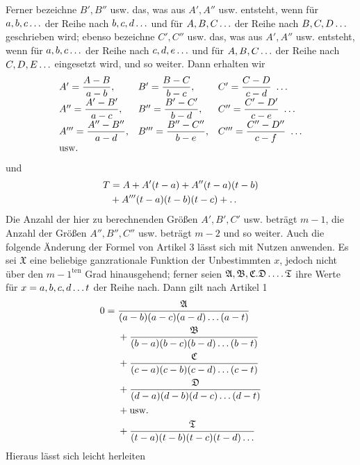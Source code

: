 Ferner bezeichne $B',B''$ usw. das, was aus $A',A''$ usw. entsteht, wenn für $a,b,c\mathinner{.\,.\,.}$
der Reihe nach $b,c,d\mathinner{.\,.\,.}$ und für $A,B,C\mathinner{.\,.\,.}$ der Reihe nach $B,C,D\mathinner{.\,.\,.}$ geschrieben wird; ebenso bezeichne $C',C''$ usw. das, was aus $A',A''$ usw. entsteht, wenn für $a,b,c\mathinner{.\,.\,.}$ der Reihe nach $c,d,e\mathinner{.\,.\,.}$ und für $A,B,C\mathinner{.\,.\,.}$ der Reihe nach $C,D,E\mathinner{.\,.\,.}$ eingesetzt wird, und so weiter. Dann erhalten wir
\[
\begin{array}{lll}
A'=\dfrac{A-B}{a-b},&B'=\dfrac{B-C}{b-c},&C'=\dfrac{C-D}{c-d}\ \mathinner{.\,.\,.}\\[5pt]
A''=\dfrac{A'-B'}{a-c},&B''=\dfrac{B'-C'}{b-d},&C''=\dfrac{C'-D'}{c-e}\ \mathinner{.\,.\,.}\\[5pt]
A'''=\dfrac{A''-B''}{a-d},&B'''=\dfrac{B''-C''}{b-e},&C'''=\dfrac{C''-D''}{c-f}\ \mathinner{.\,.\,.}\\
\text{usw.}&&
\end{array}
\]
und
\[\begin{aligned}
T&=A+A'(t-a)+A''(t-a)(t-b)\\&+A'''(t-a)(t-b)(t-c)+\mathinner{.\,.}
\end{aligned}\]
Die Anzahl der hier zu berechnenden Größen $A',B',C'$ usw. beträgt $m-1$, die Anzahl der
Größen $A'',B'',C''$ usw. beträgt $m-2$ und so weiter.
Auch die folgende Änderung der Formel von Artikel 3 lässt sich
mit Nutzen anwenden. Es sei $\mathfrak{X}$ eine beliebige ganzrationale Funktion der Unbestimmten $x$, jedoch nicht über den
$m-1^{\mathrm{ten}}$ Grad hinausgehend; ferner seien $\mathfrak{A},\mathfrak{B},\mathfrak{C}.\mathfrak{D}\mathinner{.\,.\,.\,.}\mathfrak{T}$ ihre Werte für $x=a,b,c,d\mathinner{.\,.\,.}t$
der Reihe nach. Dann gilt nach Artikel 1
\[
\begin{aligned}
0={}&\frac{\mathfrak{A}}{(a-b)(a-c)(a-d)\mathinner{.\,.\,.}(a-t)}\\
&{}+\frac{\mathfrak{B}}{(b-a)(b-c)(b-d)\mathinner{.\,.\,.}(b-t)}\\
&{}+\frac{\mathfrak{C}}{(c-a)(c-b)(c-d)\mathinner{.\,.\,.}(c-t)}\\
&{}+\frac{\mathfrak{D}}{(d-a)(d-b)(d-c)\mathinner{.\,.\,.}(d-t)}\\
&{}+\text{usw.}\\
&{}+\frac{\mathfrak{T}}{(t-a)(t-b)(t-c)(t-d)\mathinner{.\,.\,.}}
\end{aligned}
\]
Hieraus lässt sich leicht herleiten
